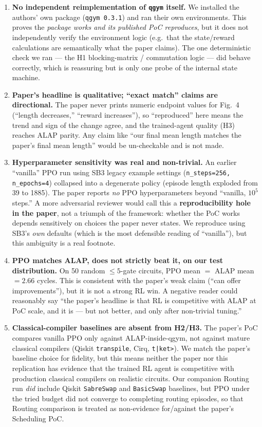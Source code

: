 \documentclass[11pt]{article}
\begin{document}
\begin{enumerate}
\item \textbf{No independent reimplementation of \texttt{qgym} itself.}
We installed the authors' own package (\texttt{qgym 0.3.1}) and ran their own
environments. This proves the \emph{package works and its published PoC
reproduces}, but it does not independently verify the environment logic
(e.g.\ that the state/reward calculations are semantically what the paper
claims). The one deterministic check we ran --- the H1 blocking-matrix /
commutation logic --- did behave correctly, which is reassuring but is only
one probe of the internal state machine.

\item \textbf{Paper's headline is qualitative; ``exact match'' claims are
directional.} The paper never prints numeric endpoint values for Fig.~4
(``length decreases,'' ``reward increases''), so ``reproduced'' here means
the trend and sign of the change agree, and the trained-agent quality
(H3) reaches ALAP parity. Any claim like ``our final mean length matches
the paper's final mean length'' would be un-checkable and is not made.

\item \textbf{Hyperparameter sensitivity was real and non-trivial.}
An earlier ``vanilla'' PPO run using SB3 legacy example settings
(\texttt{n\_steps=256, n\_epochs=4}) collapsed into a degenerate policy
(episode length exploded from 39 to 1885). The paper reports
\emph{no} PPO hyperparameters beyond ``vanilla, $10^5$ steps.'' A more
adversarial reviewer would call this a \textbf{reproducibility hole in the
paper}, not a triumph of the framework: whether the PoC works depends
sensitively on choices the paper never states. We reproduce using
SB3's \emph{own} defaults (which is the most defensible reading of
``vanilla''), but this ambiguity is a real footnote.

\item \textbf{PPO matches ALAP, does not strictly beat it, on our
test distribution.} On 50 random $\le 5$-gate circuits, PPO mean
$=$ ALAP mean $=2.66$ cycles. This is consistent with the paper's
weak claim (``can offer improvements''), but it is not a strong RL
win. A negative reader could reasonably say ``the paper's headline is
that RL is competitive with ALAP at PoC scale, and it is --- but not
better, and only after non-trivial tuning.''

\item \textbf{Classical-compiler baselines are absent from H2/H3.} The
paper's PoC compares vanilla PPO only against ALAP-inside-qgym, not against
mature classical compilers (Qiskit \texttt{transpile}, Cirq, \texttt{t|ket>}).
We match the paper's baseline choice for fidelity, but this means neither
the paper nor this replication has evidence that the trained RL agent is
competitive with production classical compilers on realistic circuits.
Our companion Routing run \emph{did} include Qiskit \texttt{SabreSwap} and
\texttt{BasicSwap} baselines, but PPO under the tried budget did not
converge to completing routing episodes, so that Routing comparison
is treated as non-evidence for/against the paper's Scheduling PoC.


\end{enumerate}
\end{document}
